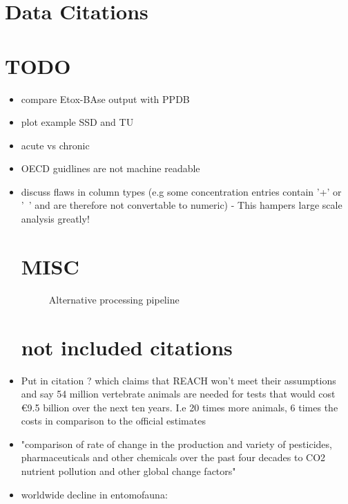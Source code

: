 \documentclass[english]{article}
\begin{document}
\pagebreak



\section*{Data Citations}

\pagebreak
\section*{TODO}

\begin{itemize}

\item compare Etox-BAse output with PPDB

\item plot example SSD and TU

\item acute vs chronic

\item OECD guidlines are not machine readable

\item discuss flaws in column types (e.g some concentration entries contain '+' or '~' and are therefore not convertable to numeric) - This hampers large scale analysis greatly!

\pagebreak
\section*{MISC}

\begin{figure}
    
    \caption{Alternative processing pipeline}
    \label{fig:pipeline-tree}
\end{figure}

\section*{not included citations}

\item Put in citation \citep{hartung_chemical_2009} ? which claims that REACH won't meet their assumptions and say 54 million vertebrate animals are needed for tests that would cost €9.5 billion over the next ten years. I.e 20 times more animals, 6 times the costs in comparison to the official estimates 

\item "comparison of rate of change in the production and variety of pesticides, pharmaceuticals and other chemicals over the past four decades to CO2 nutrient pollution and other global change factors" \citep{bernhardt_synthetic_2017}

\item worldwide decline in entomofauna: \citep{sanchez-bayo_worldwide_2019}


\end{itemize}
\end{document}
